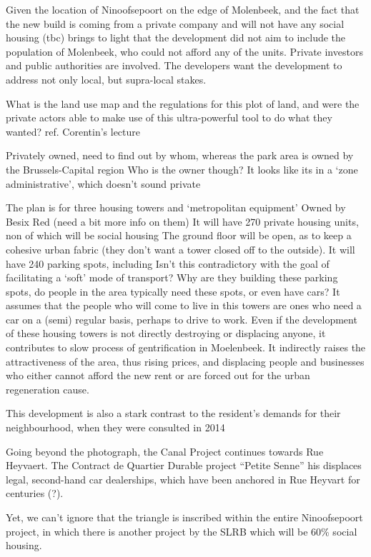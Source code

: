 \documentclass{article}[11pt]
\begin{document}
Given the location of Ninoofsepoort on the edge of Molenbeek, and the fact that the new build is coming from a private company and will not have any social housing (tbc) brings to light that the development did not aim to include the population of Molenbeek, who could not afford any of the units.
Private investors and public authorities are involved.
The developers want the development to address not only local, but supra-local stakes.


What is the land use map and the regulations for this plot of land, and were the private actors able to make use of this ultra-powerful tool to do what they wanted? ref. Corentin's lecture

Privately owned, need to find out by whom, whereas the park area is owned by the Brussels-Capital region
Who is the owner though? It looks like its in a `zone administrative', which doesn't sound private

The plan is for three housing towers and `metropolitan equipment' 
Owned by Besix Red (need a bit more info on them)
It will have 270 private housing units, non of which will be social housing
The ground floor will be open, as to keep a cohesive urban fabric (they don't want a tower closed off to the outside). 
It will have 240 parking spots, including 
Isn't this contradictory with the goal of facilitating a `soft' mode of transport? Why are they building these parking spots, do people in the area typically need these spots, or even have cars? It assumes that the people who will come to live in this towers are ones who need a car on a (semi) regular basis, perhaps to drive to work.
Even if the development of these housing towers is not directly destroying or displacing anyone, it contributes to slow process of gentrification in Moelenbeek. It indirectly raises the attractiveness of the area, thus rising prices, and displacing people and businesses who either cannot afford the new rent or are forced out for the urban regeneration cause. 

This development is also a stark contrast to the resident's demands for their neighbourhood, when they were consulted in 2014

Going beyond the photograph, the Canal Project continues towards Rue Heyvaert. The Contract de Quartier Durable project ``Petite Senne'' his displaces legal, second-hand car dealerships, which have been anchored in Rue Heyvart for centuries (?). 

Yet, we can't ignore that the triangle is inscribed within the entire Ninoofsepoort project, in which there is another project by the SLRB which will be 60\% social housing.
\end{document}
